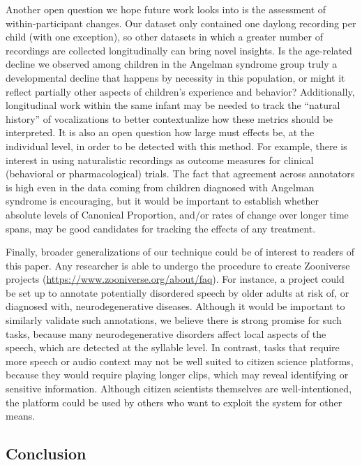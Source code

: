 \documentclass[english,,man]{apa6}
\begin{document}
Another open question we hope future work looks into is the assessment of within-participant changes. Our dataset only contained one daylong recording per child (with one exception), so other datasets in which a greater number of recordings are collected longitudinally can bring novel insights. Is the age-related decline we observed among children in the Angelman syndrome group truly a developmental decline that happens by necessity in this population, or might it reflect partially other aspects of children's experience and behavior? Additionally, longitudinal work within the same infant may be needed to track the \enquote{natural history} of vocalizations to better contextualize how these metrics should be interpreted. It is also an open question how large must effects be, at the individual level, in order to be detected with this method. For example, there is interest in using naturalistic recordings as outcome measures for clinical (behavioral or pharmacological) trials. The fact that agreement across annotators is high even in the data coming from children diagnosed with Angelman syndrome is encouraging, but it would be important to establish whether absolute levels of Canonical Proportion, and/or rates of change over longer time spans, may be good candidates for tracking the effects of any treatment.

Finally, broader generalizations of our technique could be of interest to readers of this paper. Any researcher is able to undergo the procedure to create Zooniverse projects (\url{https://www.zooniverse.org/about/faq}). For instance, a project could be set up to annotate potentially disordered speech by older adults at risk of, or diagnosed with, neurodegenerative diseases. Although it would be important to similarly validate such annotations, we believe there is strong promise for such tasks, because many neurodegenerative disorders affect local aspects of the speech, which are detected at the syllable level. In contrast, tasks that require more speech or audio context may not be well suited to citizen science platforms, because they would require playing longer clips, which may reveal identifying or sensitive information. Although citizen scientists themselves are well-intentioned, the platform could be used by others who want to exploit the system for other means.

\hypertarget{conclusion}{%
\subsection{Conclusion}\label{conclusion}}
\end{document}
